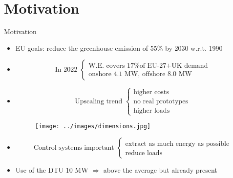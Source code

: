 \section{Motivation}
\begin{frame}{Motivation}
  \begin{itemize}
    \item EU goals: reduce the greenhouse emission of 55\% by 2030 w.r.t. 1990
    \item 
    \[
      \text{In 2022 }
      \begin{cases}
        \text{W.E. covers 17\% of EU-27+UK demand}\\
        \text{onshore 4.1 MW, offshore 8.0 MW}
      \end{cases}
    \]
    
    \item 
    \begin{multicols}{2}
    \[
      \text{Upscaling trend } 
      \begin{cases}
        \text{higher costs}\\
        \text{no real prototypes} \\
        \text{higher loads}
      \end{cases}  
    \]

      \begin{figure}
        \centering
        \texttt{[image: ../images/dimensions.jpg]}
      \end{figure}
  
    \end{multicols}
    
    \item
    \[
      \text{Control systems important }
      \begin{cases}
        \text{extract as much energy as possible}\\
        \text{reduce loads}
      \end{cases}
    \]

    \item Use of the DTU 10 MW $\Rightarrow$ above the average but already present
  \end{itemize}
\end{frame}


